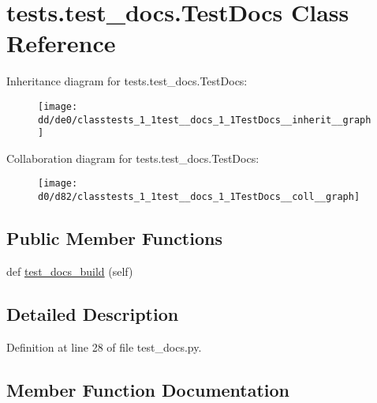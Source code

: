 \hypertarget{classtests_1_1test__docs_1_1TestDocs}{}\section{tests.\+test\+\_\+docs.\+Test\+Docs Class Reference}
\label{classtests_1_1test__docs_1_1TestDocs}


Inheritance diagram for tests.\+test\+\_\+docs.\+Test\+Docs\+:
\nopagebreak
\begin{figure}[H]
\begin{center}
\leavevmode
\texttt{[image: dd/de0/classtests\_1\_1test\_\_docs\_1\_1TestDocs\_\_inherit\_\_graph]}
\end{center}
\end{figure}


Collaboration diagram for tests.\+test\+\_\+docs.\+Test\+Docs\+:
\nopagebreak
\begin{figure}[H]
\begin{center}
\leavevmode
\texttt{[image: d0/d82/classtests\_1\_1test\_\_docs\_1\_1TestDocs\_\_coll\_\_graph]}
\end{center}
\end{figure}
\subsection*{Public Member Functions}
\begin{DoxyCompactItemize}
\item 
def \hyperlink{classtests_1_1test__docs_1_1TestDocs_ad8142c9573a84626d58a8d26cf2ac695}{test\+\_\+docs\+\_\+build} (self)
\end{DoxyCompactItemize}


\subsection{Detailed Description}


Definition at line 28 of file test\+\_\+docs.\+py.



\subsection{Member Function Documentation}
\mbox{\label{classtests_1_1test__docs_1_1TestDocs_ad8142c9573a84626d58a8d26cf2ac695}} 
